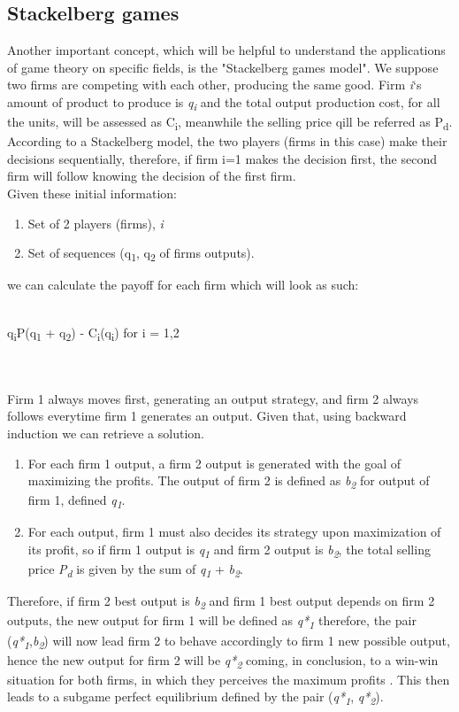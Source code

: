 \documentclass[conference]{IEEEtran}
\begin{document}
\subsection{Stackelberg games}
Another important concept, which will be helpful to understand the applications of game theory on specific fields, is the "Stackelberg games model".
We suppose two firms are competing with each other, producing the same good. Firm \textit{i}`s amount of product to produce is \textit{q\textsubscript{i}} and the total output production cost, for all the units, will be assessed as C\textsubscript{i}, meanwhile the selling price qill be referred as P\textsubscript{d}. According to a Stackelberg model, the two players (firms in this case) make their decisions sequentially, therefore, if firm i=1 makes the decision first, the second firm will follow knowing the decision of the first firm.\\
Given these initial information:
\begin{enumerate}
\item Set of 2 players (firms), \textit{i}
\item Set of sequences (q\textsubscript{1}, q\textsubscript{2} of firms outputs).
\end{enumerate}

 we can calculate the payoff for each firm which will look as such:\\\\
\centerline{q\textsubscript{i}P(q\textsubscript{1} + q\textsubscript{2}) - C\textsubscript{i}(q\textsubscript{i}) for i = 1,2}\\\\
Firm 1 always moves first, generating an output strategy, and firm 2 always follows everytime firm 1 generates an output. Given that, using backward induction we can retrieve a solution.
\begin{enumerate}
\item For each firm 1 output, a firm 2 output is generated with the goal of maximizing the profits. The output of firm 2 is defined as \textit{b\textsubscript{2}} for output of firm 1, defined \textit{q\textsubscript{1}}.
\item For each output, firm 1 must also decides its strategy upon maximization of its profit, so if firm 1 output is \textit{q\textsubscript{1}} and firm 2 output is \textit{b\textsubscript{2}}, the total selling price \textit{P\textsubscript{d}} is given by the sum of \textit{q\textsubscript{1}} + \textit{b\textsubscript{2}}.
\end{enumerate}
Therefore, if firm 2 best output is \textit{b\textsubscript{2}} and firm 1 best output depends on firm 2 outputs, the new output for firm 1 will be defined as \textit{q*\textsubscript{1}}
therefore, the pair (\textit{q*\textsubscript{1}},\textit{b\textsubscript{2}}) will now lead firm 2 to behave accordingly to firm 1 new possible output, hence the new output for firm 2 will be \textit{q*\textsubscript{2}} coming, in conclusion, to a win-win situation for both firms, in which they perceives the maximum profits . This then leads to a subgame perfect equilibrium defined by the pair (\textit{q*\textsubscript{1}}, \textit{q*\textsubscript{2}}).
\end{document}
